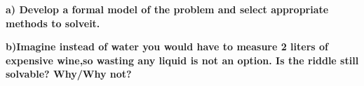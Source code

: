 \documentclass[paper=a4, fontsize=11pt]{scrartcl} %
\numberwithin{equation}{section} %
\numberwithin{figure}{section} %
\numberwithin{table}{section} %
\begin{document}
\large{ \textbf{a) Develop a formal model of the problem and select appropriate methods to solveit.}}

\newpage
\large{ \textbf{b)Imagine instead of water you would have to measure 2 liters of expensive wine,so wasting any liquid is not an option. Is the riddle still solvable? Why/Why not?}}

\newpage




\end{document}
